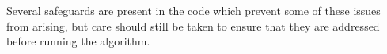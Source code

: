 \documentclass[11pt]{article}
\begin{document}
Several safeguards are present in the code which prevent some of these issues
from arising, but care should still be taken to ensure that they are addressed
before running the algorithm.





\end{document}
